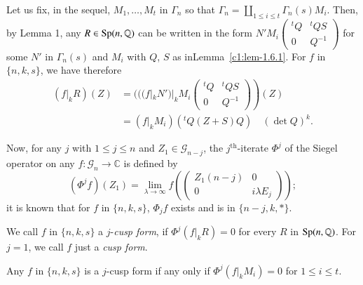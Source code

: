 Let us fix, in the sequel, $M_{1},\ldots,M_{t}$ in $\Gamma_{n}$ so
that $\Gamma_{n}=\coprod\limits_{1\leq i\leq
  t}\Gamma_{n}(s)M_{i}$. Then, by Lemma 1, any $R\in
\operatorname{Sp}(n,\mathbb{Q})$ can be written in the form\pageoriginale\break
$N'M_{i}\left(\begin{smallmatrix} {}^{t}Q & {}^{t}QS\\ 0 & Q^{-1}
\end{smallmatrix}\right)$ for some $N'$ in $\Gamma_{n}(s)$ and $M_{i}$
with $Q$, $S$ as in\break Lemma~\ref{c1:lem-1.6.1}. For $f$ in $\{n,k,s\}$, we
have therefore
\begin{align*}
(f|_{k}R)(Z) &= (((f|_{k}N')|_{k}M_{i}\left.
\begin{pmatrix}
{}^{t}Q & {}^{t}QS\\
0 & Q^{-1}
\end{pmatrix}
\right)(Z)\\
&= (f|_{k}M_{i})({}^{t}Q(Z+S)Q)\quad(\det Q)^{k}.
\end{align*}

Now, for any $j$ with $1\leq j\leq n$ and $Z_{1}\in\mathscr{G}_{n-j}$,
the $j^{\text{th}}$-iterate $\Phi^{j}$ of the Siegel operator on any
$f:\mathscr{G}_{n}\to \mathbb{C}$ is defined by
$$
(\Phi^{j} f)(Z_{1})=\lim\limits_{\lambda\to \infty}f
\left(
\begin{pmatrix}
Z_{1}(n-j) & 0\\
0 & i\lambda E_{j}
\end{pmatrix}
\right);
$$
it is known that for $f$ in $\{n,k,s\}$, $\Phi_{j}f$ exists and is in
$\{n-j,k,\ast\}$. 

\begin{defi*}
We call $f$ in $\{n,k,s\}$ a $j$-{\em cusp form}, if $\Phi^{j}(f|_{k}R)=0$
for every $R$ in $\operatorname{Sp}(n,\mathbb{Q})$. For $j=1$, we call $f$ just a
{\em cusp form}.
\end{defi*}

\begin{sublemma}\label{c1:lem-1.6.2}
Any $f$ in $\{n,k,s\}$ is a $j$-cusp form if any only if\break
$\Phi^{j}(f|_{k}M_{i})=0$ for $1\leq i\leq t$.
\end{sublemma}

